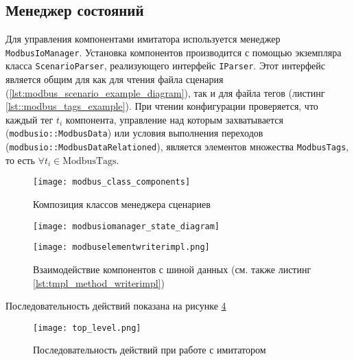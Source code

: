 \subsection{Менеджер состояний}
Для управления компонентами имитатора используется менеджер \texttt{ModbusIoManager}.
Установка компонентов производится с помощью экземпляра класса \texttt{ScenarioParser}, реализующего интерфейс \texttt{IParser}.
Этот интерфейс является общим для как для чтения файла сценария (\ref{lst:modbus_scenario_example_diagram}),
так и для файла тегов (листинг \ref{lst::modbus_tags_example}).
При чтении конфигурации проверяется, что каждый тег $t_i$ компонента,
управление над которым захватывается (\texttt{modbusio::ModbusData}) или условия выполнения переходов (\texttt{modbusio::ModbusDataRelationed}),
является элементов множества \texttt{ModbusTags}, то есть $\forall t_i \in \mbox{ModbusTags}$.
\begin{center}
    \begin{figure}[hb!]
        \texttt{[image: modbus\_class\_components]}
        \caption{Композиция классов менеджера сценариев}\label{fig:modbus_class_components}
    \end{figure}
\end{center}

\begin{center}
    \begin{figure}
        \texttt{[image: modbusiomanager\_state\_diagram]}
        \caption{}\label{fig:modbusiomanager_state_diagram}
    \end{figure}
\end{center}

\begin{center}
    \begin{figure}
        \texttt{[image: modbuselementwriterimpl.png]}
        \caption{Взаимодействие компонентов с шиной данных (см. также листинг \ref{lst:tmpl_method_writerimpl})}\label{fig:modbuselementwriterimpl}
    \end{figure}
\end{center}

Последовательность действий показана на рисунке \ref{fig:top_level_sequence} \cite[стр. 239]{book:oop:oop_analize}
\begin{center}
    \begin{figure}
        \texttt{[image: top\_level.png]}
        \caption{Последовательность действий при работе с имитатором}\label{fig:top_level_sequence}
    \end{figure}
\end{center}

